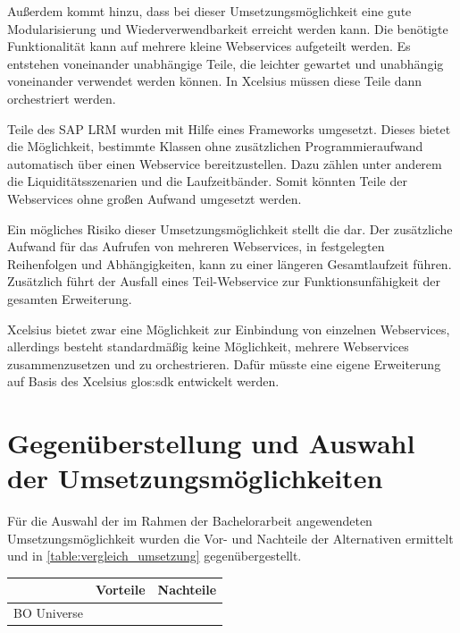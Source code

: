 \begin{onehalfspacing}
Außerdem kommt hinzu, dass bei dieser Umsetzungsmöglichkeit eine gute Modularisierung und Wiederverwendbarkeit erreicht werden kann. Die benötigte Funktionalität kann auf mehrere kleine Webservices aufgeteilt werden. Es entstehen voneinander unabhängige Teile, die leichter gewartet und unabhängig voneinander verwendet werden können. In \gls{Xcelsius} müssen diese Teile dann orchestriert werden.

Teile des SAP LRM wurden mit Hilfe eines Frameworks umgesetzt. Dieses bietet die Möglichkeit, bestimmte Klassen ohne zusätzlichen Programmieraufwand automatisch über einen Webservice bereitzustellen. Dazu zählen unter anderem die Liquiditätsszenarien und die Laufzeitbänder. Somit könnten Teile der Webservices ohne großen Aufwand umgesetzt werden.

Ein mögliches Risiko dieser Umsetzungsmöglichkeit stellt die  dar. Der zusätzliche Aufwand für das Aufrufen von mehreren Webservices, in festgelegten Reihenfolgen und Abhängigkeiten, kann zu einer längeren Gesamtlaufzeit führen. Zusätzlich führt der Ausfall eines Teil-Webservice zur Funktionsunfähigkeit der gesamten Erweiterung.

\gls{Xcelsius} bietet zwar eine Möglichkeit zur Einbindung von einzelnen Webservices, allerdings besteht standardmäßig keine Möglichkeit, mehrere Webservices zusammenzusetzen und zu orchestrieren. Dafür müsste eine eigene Erweiterung auf Basis des \gls{Xcelsius} \gls{glos:sdk} entwickelt werden.

\section{Gegenüberstellung und Auswahl der Umsetzungsmöglichkeiten}

Für die Auswahl der im Rahmen der Bachelorarbeit angewendeten Umsetzungsmöglichkeit wurden die Vor- und Nachteile der Alternativen ermittelt und in \vref{table:vergleich_umsetzung} gegenübergestellt.

{
\setlength{\extrarowheight}{2pt}
\begin{table}[htbp]
\centering
\begin{tabular}{| l | >{\centering\arraybackslash} m{5cm} | >{\centering\arraybackslash} m{5cm} |}
\cline{2-3}
\multicolumn{1}{l|}{}	& Vorteile & Nachteile \\	\hline
BO Universe 				&



\end{tabular}
\end{table}}
\end{onehalfspacing}
